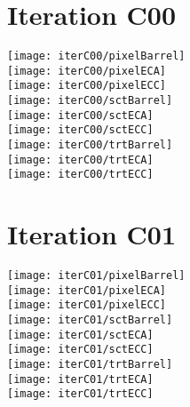 \documentclass[10pt]{article}
\begin{document}
\vspace{10pt}
\section{Iteration C00}

\begin{centering}


\texttt{[image: iterC00/pixelBarrel]}\\
\texttt{[image: iterC00/pixelECA]}\\
\texttt{[image: iterC00/pixelECC]}\\

\texttt{[image: iterC00/sctBarrel]}\\
\texttt{[image: iterC00/sctECA]}\\
\texttt{[image: iterC00/sctECC]}\\

\texttt{[image: iterC00/trtBarrel]}\\
\texttt{[image: iterC00/trtECA]}\\
\texttt{[image: iterC00/trtECC]}\\

\end{centering}
\vspace{10pt}
\section{Iteration C01}

\begin{centering}


\texttt{[image: iterC01/pixelBarrel]}\\
\texttt{[image: iterC01/pixelECA]}\\
\texttt{[image: iterC01/pixelECC]}\\

\texttt{[image: iterC01/sctBarrel]}\\
\texttt{[image: iterC01/sctECA]}\\
\texttt{[image: iterC01/sctECC]}\\

\texttt{[image: iterC01/trtBarrel]}\\
\texttt{[image: iterC01/trtECA]}\\
\texttt{[image: iterC01/trtECC]}\\

\end{centering}
\vspace{10pt}
\end{document}
